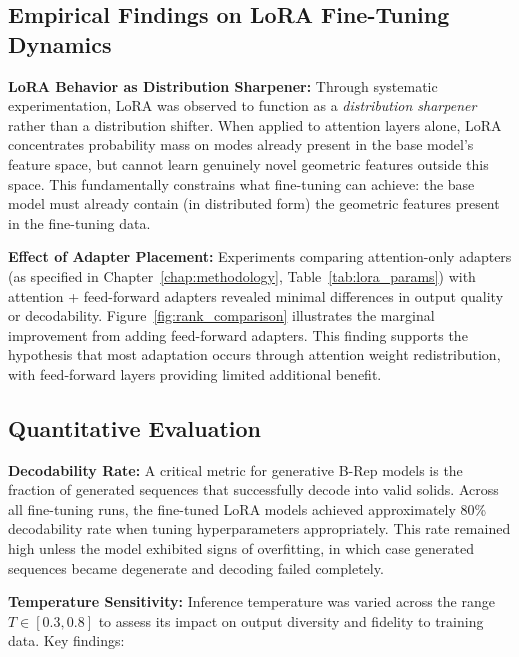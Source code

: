 \subsection{Empirical Findings on LoRA Fine-Tuning Dynamics}
\label{sec:lora_dynamics}

\textbf{LoRA Behavior as Distribution Sharpener:} Through systematic experimentation, LoRA was observed to function as a \emph{distribution sharpener} rather than a distribution shifter. When applied to attention layers alone, LoRA concentrates probability mass on modes already present in the base model's feature space, but cannot learn genuinely novel geometric features outside this space. This fundamentally constrains what fine-tuning can achieve: the base model must already contain (in distributed form) the geometric features present in the fine-tuning data.

\textbf{Effect of Adapter Placement:} Experiments comparing attention-only adapters (as specified in Chapter~\ref{chap:methodology}, Table~\ref{tab:lora_params}) with attention + feed-forward adapters revealed minimal differences in output quality or decodability. Figure~\ref{fig:rank_comparison} illustrates the marginal improvement from adding feed-forward adapters. This finding supports the hypothesis that most adaptation occurs through attention weight redistribution, with feed-forward layers providing limited additional benefit.

\subsection{Quantitative Evaluation}

\textbf{Decodability Rate:} A critical metric for generative B-Rep models is the fraction of generated sequences that successfully decode into valid solids. Across all fine-tuning runs, the fine-tuned LoRA models achieved approximately 80\% decodability rate when tuning hyperparameters appropriately. This rate remained high unless the model exhibited signs of overfitting, in which case generated sequences became degenerate and decoding failed completely.

\textbf{Temperature Sensitivity:} Inference temperature was varied across the range $T \in [0.3, 0.8]$ to assess its impact on output diversity and fidelity to training data. Key findings:

